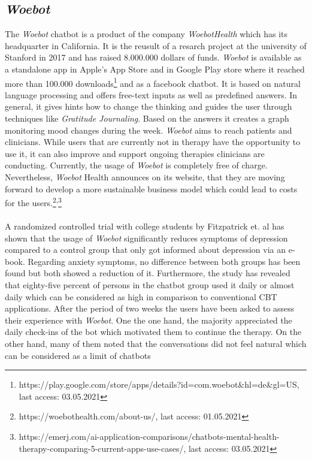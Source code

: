 \documentclass[sigconf, nonacm]{acmart}
\begin{document}
\subsection{\emph{Woebot}}
The \emph{Woebot} chatbot is a product of the company \emph{WoebotHealth} which has its headquarter in California. It is the reusult of a resarch 
project at the university of Stanford in 2017 and has raised 8.000.000 dollars of funds.
\emph{Woebot} is available as a standalone app in Apple's App Store and in Google Play store where it reached more than 100.000 downloads\footnote{https://play.google.com/store/apps/details?id=com.woebot\&hl=de\&gl=US, last access: 03.05.2021} and as 
a facebook chatbot. It is based on natural language processing and offers free-text inputs as well as predefined answers.
In general, it gives hints how to change the thinking and guides the user through techniques like \emph{Gratitude Journaling}. 
Based on the answers it creates a graph monitoring mood changes during the week.
\emph{Woebot} aims to reach patients and clinicians. While users that are currently not in therapy have the opportunity to use it,
it can also improve and support ongoing therapies clinicians are conducting.
Currently, the usage of \emph{Woebot} is completely free of charge. Nevertheless, \emph{Woebot} Health announces on its website, that they are moving forward
to develop a more sustainable business model which could lead to costs for the users.\footnote{https://woebothealth.com/about-us/, last access: 01.05.2021}\textsuperscript{,}\footnote{https://emerj.com/ai-application-comparisons/chatbots-mental-health-therapy-comparing-5-current-apps-use-cases/, last access: 03.05.2021}
\\\\
A randomized controlled trial with college students by Fitzpatrick et. al \cite{Fitzpatrick2017} has shown that the usage of \emph{Woebot} significantly reduces
symptoms of depression compared to a control group that only got informed about depression via an e-book. Regarding anxiety symptoms, no difference between
both groups has been found but both showed a reduction of it. Furthermore, the study has revealed that eighty-five percent of persons in the chatbot group used 
it daily or almost daily which can be considered as high in comparison to conventional CBT applications\cite{Ludden2015}.
After the period of two weeks the users have been asked to assess their experience with \emph{Woebot}. One the one hand, the majority appreciated the daily check-ins of the bot 
which motivated them to continue the therapy. On the other hand, many of them noted that the conversations did not feel natural which can be considered as a limit of chatbots
\end{document}
